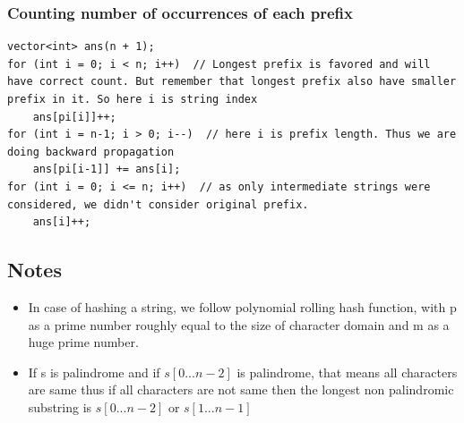\documentclass[8pt, a4paper, oneside, twocolumn]{extarticle}
\begin{document}
\subsubsection{Counting number of occurrences of each prefix}
\begin{verbatim}
vector<int> ans(n + 1);
for (int i = 0; i < n; i++)  // Longest prefix is favored and will have correct count. But remember that longest prefix also have smaller prefix in it. So here i is string index
    ans[pi[i]]++;
for (int i = n-1; i > 0; i--)  // here i is prefix length. Thus we are doing backward propagation
    ans[pi[i-1]] += ans[i];
for (int i = 0; i <= n; i++)  // as only intermediate strings were considered, we didn't consider original prefix.
    ans[i]++;
\end{verbatim}
\subsection{Notes}
\begin{itemize}
	\item In case of hashing a string, we follow polynomial rolling hash function, with p as a prime number roughly equal to the size of character domain and m as a huge prime number.
	\item If s is palindrome and if $s[0...n - 2]$ is palindrome, that means all characters are same thus if all characters are not same then the longest non palindromic substring is $s[0...n - 2]$ or $s[1...n - 1]$
\end{itemize}
\end{document}
